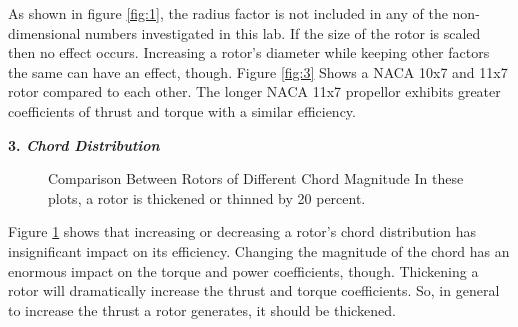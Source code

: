 \documentclass{article}
\begin{document}
As shown in figure \ref{fig:1}, the radius factor is not included in any of the non-dimensional numbers investigated in this lab. If the size of the rotor is scaled then no effect occurs. Increasing a rotor's diameter while keeping other factors the same can have an effect, though. Figure \ref{fig:3} Shows a NACA 10x7 and 11x7 rotor compared to each other. The longer NACA 11x7 propellor exhibits greater coefficients of thrust and torque with a similar efficiency. \newline

\textbf{3. \emph{Chord Distribution}} \newline

\begin{figure}
  \centering
  \caption{Comparison Between Rotors of Different Chord Magnitude \newline In these plots, a rotor is thickened or thinned by 20 percent.}
  \label{fig:4}
\end{figure}

Figure \ref{fig:4} shows that increasing or decreasing a rotor's chord distribution has insignificant impact on its efficiency. Changing the magnitude of the chord has an enormous impact on the torque and power coefficients, though. Thickening a rotor will dramatically increase the thrust and torque coefficients. So, in general to increase the thrust a rotor generates, it should be thickened. \newline
\end{document}
